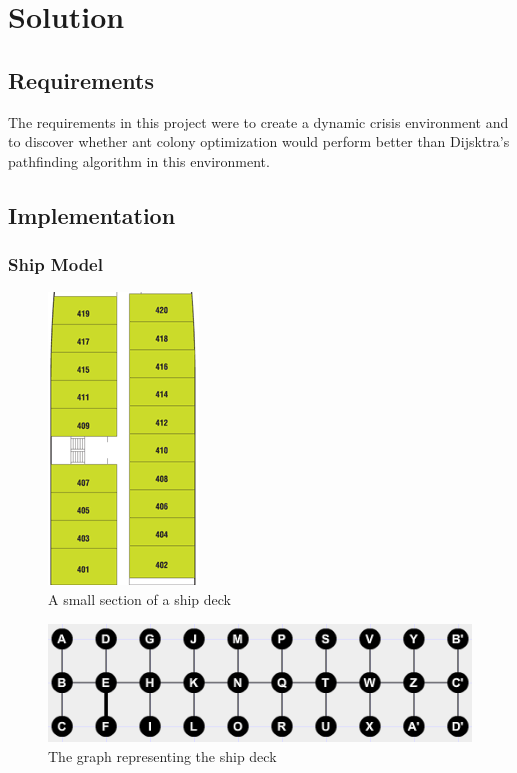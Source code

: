 \chapter{Solution}
\label{ch:solution}

\section{Requirements}

The requirements in this project were to create a dynamic crisis environment and to discover whether ant colony optimization would perform better than Dijsktra's pathfinding algorithm in this environment. 

\section{Implementation}

\subsection{Ship Model}

\begin{figure} [h]
\centering
\includegraphics[angle=90]{images/rooms.png}
\caption{A small section of a ship deck}
\label{fig:rooms}
\end{figure}

\begin{figure} [h]
\centering
\includegraphics{images/simple.png}
\caption{The graph representing the ship deck}
\label{fig:simple}
\end{figure}

